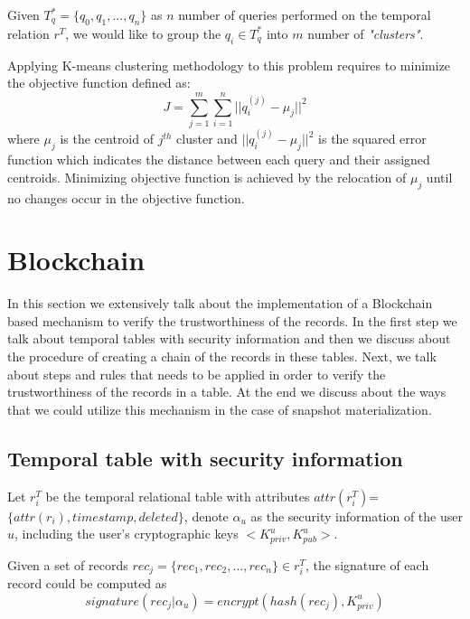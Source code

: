 			\begin{prop} 
				Given $T_q^* = \{q_0,q_1,...,q_n\}$ as $n$ number of queries performed on the temporal relation $r^T$, we would like to group the $q_i \in T_q^*$ into $m$ number of \textit{"clusters"}. 
			\label{prop:heuristic_method}
			\end{prop}

			Applying K-means clustering methodology to this problem requires to minimize the objective function defined as:
			$$J = \sum_{j=1}^{m} \sum_{i=1}^{n} ||q_i^{(j)}-\mu_j||^2$$
			where $\mu_j$ is the centroid of $j^{th}$ cluster and $||q_i^{(j)}-\mu_j||^2$ is the squared error function which indicates the distance between each query and their assigned centroids.
			Minimizing objective function is achieved by the relocation of $\mu_j$ until no changes occur in the objective function.

	\section{Blockchain} \label{sec:blockchain}
		In this section we extensively talk about the implementation of a Blockchain based mechanism to verify the trustworthiness of the records. In the first step we talk about temporal tables with security information and then we discuss about the procedure of creating a chain of the records in these tables. Next, we talk about steps and rules that needs to be applied in order to verify the trustworthiness of the records in a table. At the end we discuss about the ways that we could utilize this mechanism in the case of snapshot materialization.

		\subsection{Temporal table with security information} \label{sec:temporal_with_security}
			Let $r_i^T$ be the temporal relational table with attributes $attr(r_i^T)$=$\{attr(r_i), timestamp,deleted\}$, denote $\alpha_u$ as the security information of the user $u$, including the user's cryptographic keys $<K_{priv}^u, K_{pub}^u>$.


			\begin{defn} 
				Given a set of records $rec_j =\{rec_1,rec_2,...,rec_n\} \in r_i^T$, the signature of each record could be computed as $$signature(rec_j|\alpha_u)= encrypt(hash(rec_j),K_{priv}^u)$$  
			\label{defn:digital_signature}
			\end{defn}

